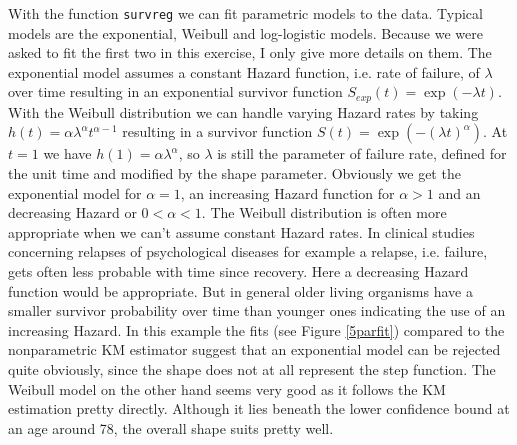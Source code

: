 With the function \texttt{survreg} we can fit parametric models to the data. Typical models are the exponential, Weibull and log-logistic models. Because we were asked to fit the first two in this exercise, I only give more details on them. The exponential model assumes a constant Hazard function, i.e. rate of failure, of $\lambda$ over time resulting in an exponential survivor function $S_{exp}(t)=\exp(-\lambda t)$. With the Weibull distribution we can handle varying Hazard rates by taking $h(t)=\alpha \lambda ^{\alpha} t^{\alpha-1}$ resulting in a survivor function $S(t)=\exp(-(\lambda t)^\alpha)$. At $t=1$ we have $h(1)=\alpha\lambda^\alpha$, so $\lambda$ is still the parameter of failure rate, defined for the unit time and modified by the shape parameter. Obviously we get the exponential model for $\alpha=1$, an increasing Hazard function for $\alpha>1$ and an decreasing Hazard or $0<\alpha<1$. The Weibull distribution is often more appropriate when we can't assume constant Hazard rates. In clinical studies concerning relapses of psychological diseases for example a relapse, i.e. failure, gets often less probable with time since recovery. Here a decreasing Hazard function would be appropriate. But in general older living organisms have a smaller survivor probability over time than younger ones indicating the use of an increasing Hazard. In this example the fits (see Figure \ref{5parfit}) compared to the nonparametric KM estimator suggest that an exponential model can be rejected quite obviously, since the shape does not at all represent the step function. The Weibull model on the other hand seems very good as it follows the KM estimation pretty directly. Although it lies beneath the lower confidence bound at an age around 78, the overall shape suits pretty well.  

